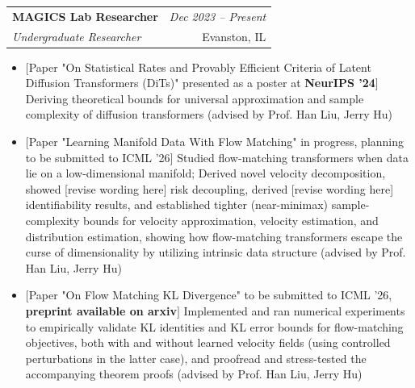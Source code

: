 \documentclass[a4paper,11pt]{article}
\makeatletter
\newcommand{\resumeSubheading}[4]{
\vspace{0.5mm}\item
    \begin{tabular*}{0.98\textwidth}[t]{l@{\extracolsep{\fill}}r}
        \textbf{#1} & \textit{\footnotesize{#4}} \\
        \textit{\footnotesize{#3}} &  \footnotesize{#2}\\
    \end{tabular*}
    \vspace{-2.4mm}
}
\newcommand{\resumeItemListStart}{\begin{itemize}[leftmargin=*,labelsep=1mm,itemsep=0.5mm]}
\newcommand{\resumeItemListEnd}{\end{itemize}\vspace{-2mm}}
\makeatother
\begin{document}
\resumeSubheading
    {MAGICS Lab Researcher}{Evanston, IL}
    {Undergraduate Researcher}{Dec 2023 – Present}
    \resumeItemListStart
      \item $[$Paper "On Statistical Rates and Provably Efficient Criteria of Latent Diffusion Transformers (DiTs)" presented as a poster at \textbf{NeurIPS '24}$]$ Deriving theoretical bounds for universal approximation and sample complexity of diffusion transformers (advised by Prof. Han Liu, Jerry Hu)
      \item $[$Paper "Learning Manifold Data With Flow Matching" in progress, planning to be submitted to ICML '26$]$ Studied flow-matching transformers when data lie on a low-dimensional manifold; Derived novel velocity decomposition, showed [revise wording here] risk decoupling, derived [revise wording here] identifiability results, and established tighter (near-minimax) sample-complexity bounds for velocity approximation, velocity estimation, and distribution estimation, showing how flow-matching transformers escape the curse of dimensionality by utilizing intrinsic data structure (advised by Prof. Han Liu, Jerry Hu)
      \item $[$Paper "On Flow Matching KL Divergence" to be submitted to ICML '26, \textbf{preprint available on arxiv}$]$ Implemented and ran numerical experiments to empirically validate KL identities and KL error bounds for flow-matching objectives, both with and without learned velocity fields (using controlled perturbations in the latter case), and proofread and stress-tested the accompanying theorem proofs (advised by Prof. Han Liu, Jerry Hu)
    \resumeItemListEnd

\end{document}
